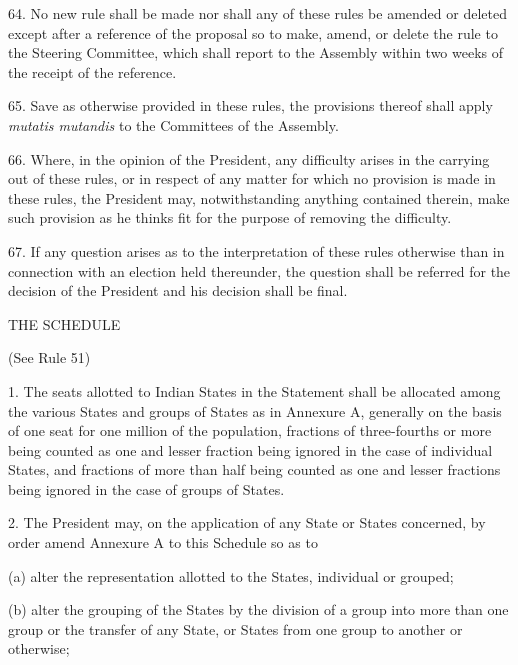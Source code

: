 64. No new rule shall be made nor shall any of these rules be amended or deleted except after a reference of the proposal so to make, amend, or delete the rule to the Steering Committee, which shall report to the Assembly within two weeks of the receipt of the reference.



65. Save as otherwise provided in these rules, the provisions thereof shall apply \emph{mutatis mutandis} to the Committees of the Assembly.



66. Where, in the opinion of the President, any difficulty arises in the carrying out of these rules, or in respect of any matter for which no provision is made in these rules, the President may, notwithstanding anything contained therein, make such provision as he thinks fit for the purpose of removing the difficulty.



67. If any question arises as to the interpretation of these rules otherwise than in connection with an election held thereunder, the question shall be referred for the decision of the President and his decision shall be final.



\begin{center}
THE SCHEDULE \end{center}
\begin{center}
(See Rule 51) \end{center}


1. The seats allotted to Indian States in the Statement shall be allocated among the various States and groups of States as in Annexure A, generally on the basis of one seat for one million of the population, fractions of three-fourths or more being counted as one and lesser fraction being ignored in the case of individual States, and fractions of more than half being counted as one and lesser fractions being ignored in the case of groups of States.



2. The President may, on the application of any State or States concerned, by order amend Annexure A to this Schedule so as to\textemdash{}



(a) alter the representation allotted to the States, individual or grouped;



(b) alter the grouping of the States by the division of a group into more than one group or the transfer of any State, or States from one group to another or otherwise; 



